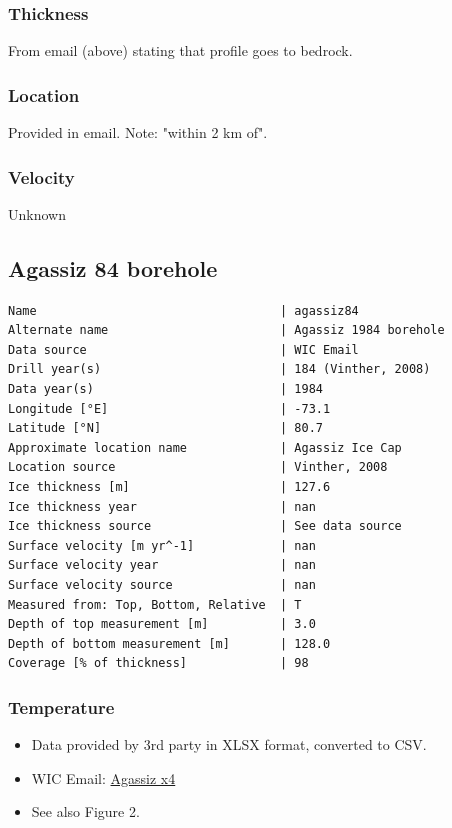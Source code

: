 \documentclass[article,a4paper,times,11pt,twoside]{article}
\begin{document}
\subsubsection{Thickness}
\label{sec:org085876f}

From email (above) stating that profile goes to bedrock.

\subsubsection{Location}
\label{sec:org26f7f8a}

Provided in email. Note: "within 2 km of".

\subsubsection{Velocity}
\label{sec:orgedc8849}

Unknown
\clearpage
\subsection{Agassiz 84 borehole}
\label{sec:orgfd4de19}
\begin{verbatim}
Name                                  | agassiz84
Alternate name                        | Agassiz 1984 borehole
Data source                           | WIC Email
Drill year(s)                         | 184 (Vinther, 2008)
Data year(s)                          | 1984
Longitude [°E]                        | -73.1
Latitude [°N]                         | 80.7
Approximate location name             | Agassiz Ice Cap
Location source                       | Vinther, 2008
Ice thickness [m]                     | 127.6
Ice thickness year                    | nan
Ice thickness source                  | See data source
Surface velocity [m yr^-1]            | nan
Surface velocity year                 | nan
Surface velocity source               | nan
Measured from: Top, Bottom, Relative  | T
Depth of top measurement [m]          | 3.0
Depth of bottom measurement [m]       | 128.0
Coverage [% of thickness]             | 98
\end{verbatim}

\subsubsection{Temperature}
\label{sec:org664b4ac}

\begin{itemize}
\item Data provided by 3rd party in XLSX format, converted to CSV.
\item WIC Email: \href{msgid:AM0PR04MB6129DE88C9253A951702EE06A2F30@AM0PR04MB6129.eurprd04.prod.outlook.com}{Agassiz x4}
\item See also \textcite{clarke_1987_wind} Figure 2.
\end{itemize}
\end{document}
